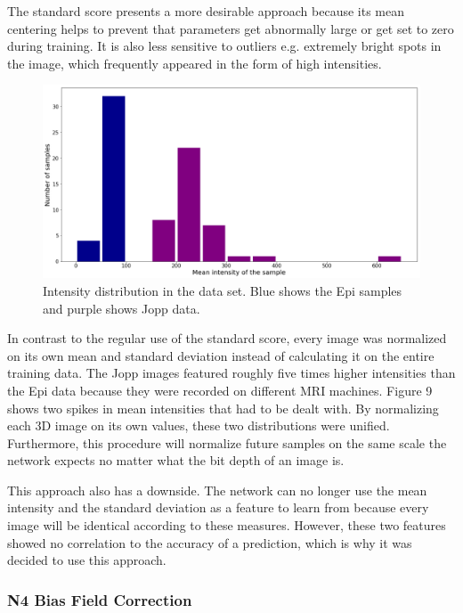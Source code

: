 The standard score presents a more desirable approach because its mean centering helps to prevent that parameters get abnormally large or get set to zero during training. It is also less sensitive to outliers e.g. extremely bright spots in the image, which frequently appeared in the form of high intensities.

\begin{figure}[H]
\centering
\par
\includegraphics[width=1.0\textwidth]{imgs/intensity_distr.png}
\caption{Intensity distribution in the data set. Blue shows the Epi samples and purple shows Jopp data.}
\par
\end{figure}

In contrast to the regular use of the standard score, every image was normalized on its own mean and standard deviation instead of calculating it on the entire training data. The Jopp images featured roughly five times higher intensities than the Epi data because they were recorded on different MRI machines. Figure 9 shows two spikes in mean intensities that had to be dealt with. By normalizing each 3D image on its own values, these two distributions were unified. Furthermore, this procedure will normalize future samples on the same scale the network expects no matter what the bit depth of an image is.

This approach also has a downside. The network can no longer use the mean intensity and the standard deviation as a feature to learn from because every image will be identical according to these measures. However, these two features showed no correlation to the accuracy of a prediction, which is why it was decided to use this approach.

\subsubsection{N4 Bias Field Correction}

